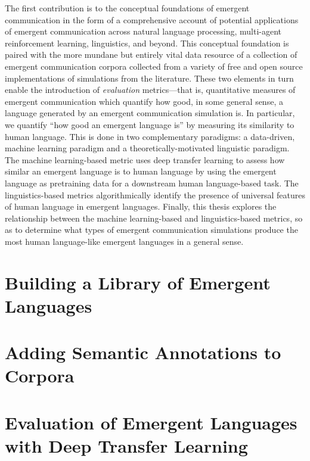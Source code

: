 The first contribution is to the conceptual foundations of emergent communication in the form of a comprehensive account of potential applications of emergent communication across natural language processing, multi-agent reinforcement learning, linguistics, and beyond.
This conceptual foundation is paired with the more mundane but entirely vital data resource of a collection of emergent communication corpora collected from a variety of free and open source implementations of simulations from the literature.
These two elements in turn enable the introduction of \emph{evaluation} metrics---that is, quantitative measures of emergent communication which quantify how good, in some general sense, a language generated by an emergent communication simulation is.
In particular, we quantify ``how good an emergent language is'' by measuring its similarity to human language.
This is done in two complementary paradigms: a data-driven, machine learning paradigm and a theoretically-motivated linguistic paradigm.
The machine learning-based metric uses deep transfer learning to assess how similar an emergent language is to human language by using the emergent language as pretraining data for a downstream human language-based task.
The linguistics-based metrics algorithmically identify the presence of universal features of human language in emergent languages.
Finally, this thesis explores the relationship between the machine learning-based and linguistics-based metrics, so as to determine what types of emergent communication simulations produce the most human language-like emergent languages in a general sense.


\newpage
\tableofcontents*



\chapter{Building a Library of Emergent Languages }
\unskip\label{ch:elcc}



\chapter{Adding Semantic Annotations to Corpora }
\unskip\label{ch:rich-corpora}



\chapter{Evaluation of Emergent Languages with Deep Transfer Learning}
\unskip\label{ch:xferbench}


